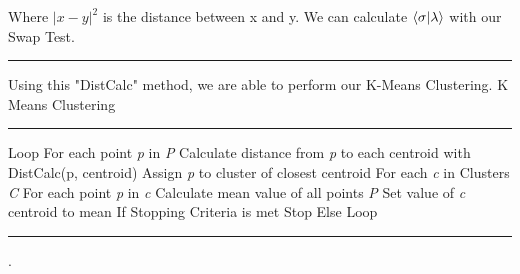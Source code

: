 \documentclass[conference]{IEEEtran}
\begin{document}
Where $|x-y|^2$ is the distance between x and y. We can calculate $\bra{\sigma}\ket{\lambda}$ with our Swap Test. 
\newline
\noindent\rule{\columnwidth}{1pt}
\newline
\indent Using this "DistCalc" method, we are able to perform our K-Means Clustering. \newline
\newline
{\large K Means Clustering} \newline
\noindent\rule{\columnwidth}{1pt}
Loop \newline
\indent For each point \emph{p} in \emph{P} \newline
\indent \indent Calculate distance from \emph{p} to each centroid with \newline 
\indent \indent DistCalc(p, centroid) \newline
\indent \indent Assign \emph{p} to cluster of closest centroid \newline
\indent For each \emph{c} in Clusters \emph{C} \newline
\indent \indent For each point \emph{p} in \emph{c} \newline
\indent \indent \indent Calculate mean value of all points \emph{P} \newline
\indent \indent \indent Set value of \emph{c} centroid to mean \newline
\indent If Stopping Criteria is met \newline
\indent \indent Stop \newline
\indent Else \newline
\indent\indent Loop \newline
\noindent\rule{\columnwidth}{1pt}
\cite{b6}.
\end{document}
